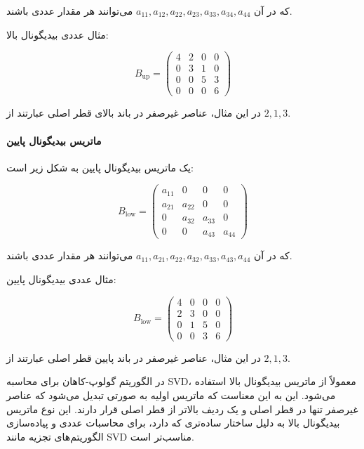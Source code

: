 که در آن \(a_{11}, a_{12}, a_{22}, a_{23}, a_{33}, a_{34}, a_{44}\) می‌توانند هر مقدار عددی باشند.

مثال عددی بیدیگونال بالا:

\[
B_{\text{up}} = \begin{pmatrix}
4 & 2 & 0 & 0 \\
0 & 3 & 1 & 0 \\
0 & 0 & 5 & 3 \\
0 & 0 & 0 & 6
\end{pmatrix}
\]

در این مثال، عناصر غیرصفر در باند بالای قطر اصلی عبارتند از \(2, 1, 3\).


\paragraph{ماتریس بیدیگونال پایین}


یک ماتریس بیدیگونال پایین به شکل زیر است:

\[
B_{\text{low}} = \begin{pmatrix}
a_{11} & 0 & 0 & 0 \\
a_{21} & a_{22} & 0 & 0 \\
0 & a_{32} & a_{33} & 0 \\
0 & 0 & a_{43} & a_{44}
\end{pmatrix}
\]

که در آن \(a_{11}, a_{21}, a_{22}, a_{32}, a_{33}, a_{43}, a_{44}\) می‌توانند هر مقدار عددی باشند.

مثال عددی بیدیگونال پایین:

\[
B_{\text{low}} = \begin{pmatrix}
4 & 0 & 0 & 0 \\
2 & 3 & 0 & 0 \\
0 & 1 & 5 & 0 \\
0 & 0 & 3 & 6
\end{pmatrix}
\]

در این مثال، عناصر غیرصفر در باند پایین قطر اصلی عبارتند از \(2, 1, 3\).





در الگوریتم گولوپ-کاهان برای محاسبه SVD، معمولاً از ماتریس بیدیگونال بالا  استفاده می‌شود. این به این معناست که ماتریس اولیه به صورتی تبدیل می‌شود که عناصر غیرصفر تنها در قطر اصلی و یک ردیف بالاتر از قطر اصلی قرار دارند. این نوع ماتریس بیدیگونال بالا به دلیل ساختار ساده‌تری که دارد، برای محاسبات عددی و پیاده‌سازی الگوریتم‌های تجزیه مانند SVD مناسب‌تر است.

\pagebreak

